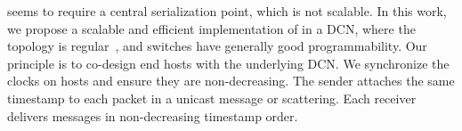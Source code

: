 


\sys{} seems to require a central serialization point, which is not scalable.
In this work, we propose a scalable and efficient implementation of \sys{} in a DCN, where the topology is regular~\cite{leiserson1985fat,greenberg2009vl2}, and switches have generally good programmability.
Our principle is to co-design end hosts with the underlying DCN.
We synchronize the clocks on hosts and ensure they are non-decreasing.
The sender attaches the same timestamp to each packet in a unicast message or scattering.
Each receiver delivers messages in non-decreasing timestamp order.


